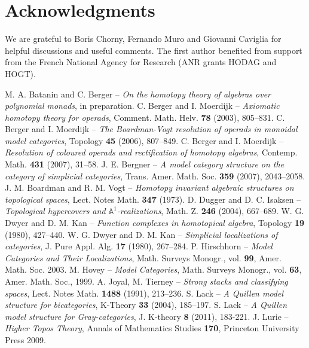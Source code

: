 \documentclass[10pt]{amsart}
\theoremstyle{plain}
\theoremstyle{remark}
\begin{document}
\section*{Acknowledgments}

We are grateful to Boris Chorny, Fernando Muro and Giovanni Caviglia for helpful discussions and useful comments. The first author benefited from support from the French National Agency for Research (ANR grants HODAG and HOGT).

\begin{thebibliography}{99}

M. A. Batanin and C. Berger -- \emph{On the homotopy theory of algebras over polynomial monads}, in preparation.
C. Berger and I. Moerdijk -- \emph{Axiomatic homotopy theory for operads}, Comment. Math. Helv. \textbf{78} (2003), 805--831.
C. Berger and I. Moerdijk -- \emph{The Boardman-Vogt resolution of operads in monoidal model categories}, Topology \textbf{45} (2006), 807--849.
C. Berger and I. Moerdijk -- \emph{Resolution of coloured operads and rectification of homotopy algebras}, Contemp. Math. \textbf{431} (2007), 31--58.
J. E. Bergner -- \emph{A model category structure on the category of simplicial categories}, Trans. Amer. Math. Soc. \textbf{359} (2007), 2043--2058.
J. M. Boardman and R. M. Vogt -- \emph{Homotopy invariant algebraic structures on topological spaces}, Lect. Notes Math. \textbf{347} (1973).
D. Dugger and D. C. Isaksen -- \emph{Topological hypercovers and $\mathbb{A}^1$-realizations}, Math. Z. \textbf{246} (2004), 667--689.
W. G. Dwyer and D. M. Kan -- \emph{Function complexes in homotopical algebra}, Topology \textbf{19} (1980), 427--440.
W. G. Dwyer and D. M. Kan -- \emph{Simplicial localizations of categories}, J. Pure Appl. Alg. \textbf{17} (1980), 267--284.
P. Hirschhorn -- \emph{Model Categories and Their Localizations}, Math. Surveys Monogr., vol. \textbf{99}, Amer. Math. Soc. 2003.
M. Hovey -- \emph{Model Categories}, Math. Surveys Monogr., vol. \textbf{63}, Amer. Math. Soc., 1999.
A. Joyal, M. Tierney -- \emph{Strong stacks and classifying spaces}, Lect. Notes Math. \textbf{1488} (1991), 213--236.
S. Lack -- \emph{A Quillen model structure for bicategories}, K-Theory \textbf{33} (2004), 185--197.
S. Lack -- \emph{A Quillen model structure for Gray-categories}, J. K-theory \textbf{8} (2011), 183-221.
J. Lurie -- \emph{Higher Topos Theory}, Annals of Mathematics Studies \textbf{170}, Princeton University Press 2009.

\end{thebibliography}
\end{document}
